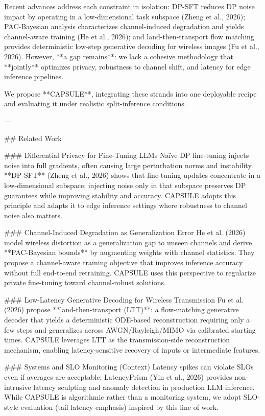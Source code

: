 Recent advances address each constraint in isolation: DP-SFT reduces DP noise impact by operating in a low-dimensional task subspace (Zheng et al., 2026); PAC-Bayesian analysis characterizes channel-induced degradation and yields channel-aware training (He et al., 2026); and land-then-transport flow matching provides deterministic low-step generative decoding for wireless images (Fu et al., 2026). However, **a gap remains**: we lack a cohesive methodology that **jointly** optimizes privacy, robustness to channel shift, and latency for edge inference pipelines.

We propose **CAPSULE**, integrating these strands into one deployable recipe and evaluating it under realistic split-inference conditions.

---

## Related Work  

### Differential Privacy for Fine-Tuning LLMs  
Naïve DP fine-tuning injects noise into full gradients, often causing large perturbation norms and instability. **DP-SFT** (Zheng et al., 2026) shows that fine-tuning updates concentrate in a low-dimensional subspace; injecting noise only in that subspace preserves DP guarantees while improving stability and accuracy. CAPSULE adopts this principle and adapts it to edge inference settings where robustness to channel noise also matters.

### Channel-Induced Degradation as Generalization Error  
He et al. (2026) model wireless distortion as a generalization gap to unseen channels and derive **PAC-Bayesian bounds** by augmenting weights with channel statistics. They propose a channel-aware training objective that improves inference accuracy without full end-to-end retraining. CAPSULE uses this perspective to regularize private fine-tuning toward channel-robust solutions.

### Low-Latency Generative Decoding for Wireless Transmission  
Fu et al. (2026) propose **land-then-transport (LTT)**: a flow-matching generative decoder that yields a deterministic ODE-based reconstruction requiring only a few steps and generalizes across AWGN/Rayleigh/MIMO via calibrated starting times. CAPSULE leverages LTT as the transmission-side reconstruction mechanism, enabling latency-sensitive recovery of inputs or intermediate features.

### Systems and SLO Monitoring (Context)  
Latency spikes can violate SLOs even if averages are acceptable; LatencyPrism (Yin et al., 2026) provides non-intrusive latency sculpting and anomaly detection in production LLM inference. While CAPSULE is algorithmic rather than a monitoring system, we adopt SLO-style evaluation (tail latency emphasis) inspired by this line of work.


